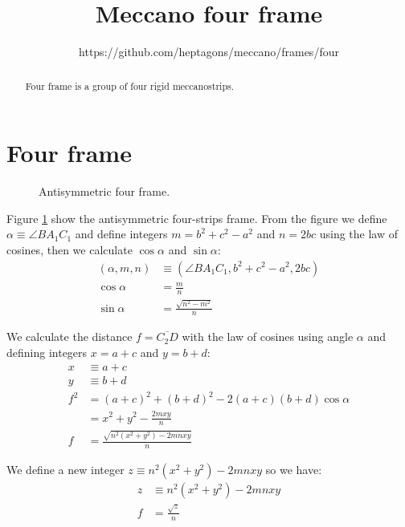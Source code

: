 \documentclass[11pt]{article}
\title{\textbf{Meccano four frame}}
\author{https://github.com/heptagons/meccano/frames/four}
\date{}
\begin{document}
\maketitle
\begin{abstract}
Four frame is a group of four rigid meccano\meccanoref strips.
\end{abstract}

\section{Four frame}

\begin{figure}[H]
 \centering
 \caption{Antisymmetric four frame.}
 \label{fig:four}
\end{figure}

Figure \ref{fig:four} show the antisymmetric four-strips frame.
From the figure we define $\alpha \equiv \angle{BA_1C_1}$ and define integers $m=b^2 + c^2 - a^2$ and $n=2bc$ using the law of cosines, then we calculate $\cos\alpha$ and $\sin\alpha$:
\begin{align}
(\alpha,m,n) &\equiv (\angle{BA_1C_1},b^2 + c^2 - a^2, 2bc)\\
\cos\alpha &= \frac{m}n\\
\sin\alpha &= \frac{\sqrt{n^2-m^2}}n
\end{align}

We calculate the distance $f = \overline{C_2D}$ with the law of cosines using angle $\alpha$
and defining integers $x = a+c$ and $y = b+d$:
\begin{align}
x &\equiv a + c\\
y &\equiv b + d\\
f^2 &= (a+c)^2 + (b+d)^2 - 2(a+c)(b+d)\cos\alpha\\
 &= x^2 + y^2 - \frac{2mxy}n\\
f &= \frac{\sqrt{n^2(x^2 + y^2) - 2mnxy}}n
\end{align}

We define a new integer $z \equiv n^2(x^2 + y^2) - 2mnxy$ so we have:
\begin{align}
z &\equiv n^2(x^2 + y^2) - 2mnxy\\
f &= \frac{\sqrt{z}}n
\end{align}
\end{document}
